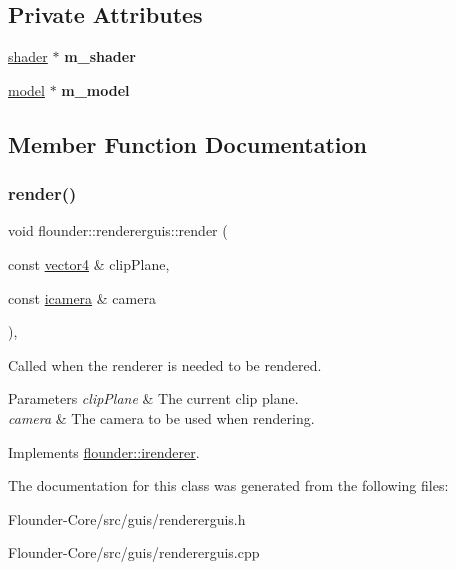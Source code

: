 \subsection*{Private Attributes}
\begin{DoxyCompactItemize}
\item 
\mbox{\label{classflounder_1_1rendererguis_ae201eb0e348ba4c4a5602cfc598c8793}} 
\hyperlink{classflounder_1_1shader}{shader} $\ast$ {\bfseries m\+\_\+shader}
\item 
\mbox{\label{classflounder_1_1rendererguis_ab69d03afbf251201d245a833a04198ac}} 
\hyperlink{classflounder_1_1model}{model} $\ast$ {\bfseries m\+\_\+model}
\end{DoxyCompactItemize}


\subsection{Member Function Documentation}
\mbox{\label{classflounder_1_1rendererguis_afdf543d9a5dfbe3c7fdd9d266dd34981}} 
\subsubsection{\texorpdfstring{render()}{render()}}
{\footnotesize\ttfamily void flounder\+::rendererguis\+::render (\begin{DoxyParamCaption}\item[{const \hyperlink{classflounder_1_1vector4}{vector4} \&}]{clip\+Plane,  }\item[{const \hyperlink{classflounder_1_1icamera}{icamera} \&}]{camera }\end{DoxyParamCaption})\hspace{0.3cm}{\ttfamily [override]}, {\ttfamily [virtual]}}



Called when the renderer is needed to be rendered. 


\begin{DoxyParams}{Parameters}
{\em clip\+Plane} & The current clip plane. \\
\hline
{\em camera} & The camera to be used when rendering. \\
\hline
\end{DoxyParams}


Implements \hyperlink{classflounder_1_1irenderer_a3f355dc39e2680bf3f3441d3dfaaa010}{flounder\+::irenderer}.



The documentation for this class was generated from the following files\+:\begin{DoxyCompactItemize}
\item 
Flounder-\/\+Core/src/guis/rendererguis.\+h\item 
Flounder-\/\+Core/src/guis/rendererguis.\+cpp\end{DoxyCompactItemize}
